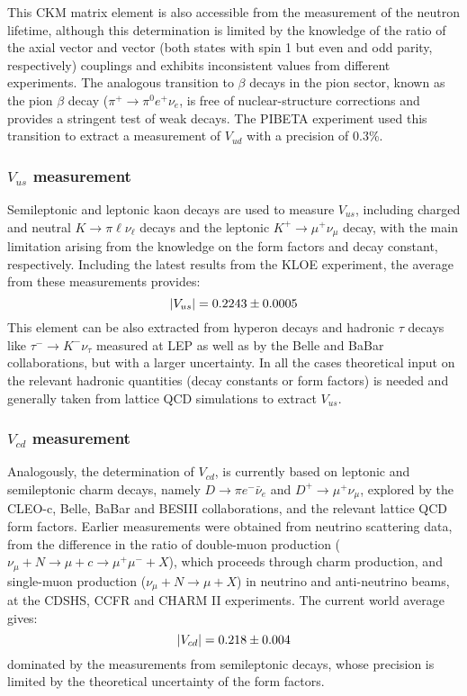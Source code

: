 \documentclass[../../main/main.tex]{subfiles}
\begin{document}
This CKM matrix element is also accessible from the measurement of the neutron lifetime, although this determination is limited by the knowledge of the ratio of the axial vector and vector (both states with spin 1 but even and odd parity, respectively) couplings and exhibits inconsistent values from different experiments.
The analogous transition to \( \beta \) decays in the pion sector, known as the pion \( \beta \) decay (\( \pi^+ \rightarrow \pi^0e^+\nu_e \), is free of nuclear-structure corrections and provides a stringent test of weak decays. The PIBETA experiment used this transition to extract a measurement of \( V_{ud} \) with a precision of 0.3\%.


\subsubsection*{\( V_{us} \) measurement}
Semileptonic and leptonic kaon decays are used to measure \( V_{us} \), including charged and neutral \( K \rightarrow \pi \ell \nu_{\ell} \) decays and the leptonic \( K^+ \rightarrow \mu^+\nu_{\mu} \) decay, with the main limitation arising from the knowledge on the form factors and decay constant, respectively. Including the latest results from the KLOE experiment, the average from these measurements provides:
\begin{equation}
	\abs{V_{us}}
	=
	0.2243 \pm 0.0005
	\label{eq:}
\end{equation}
This element can be also extracted from hyperon decays and hadronic \( \tau \) decays like \( \tau^- \rightarrow K^- \nu_{\tau} \) measured at LEP as well as by the Belle and BaBar collaborations, but with a larger uncertainty. In all the cases theoretical input on the relevant hadronic quantities (decay constants or form factors) is needed and generally taken from lattice QCD simulations to extract \( V_{us} \).


\subsubsection*{\( V_{cd} \) measurement}
Analogously, the determination of \( V_{cd} \), is currently based on leptonic and semileptonic charm decays, namely \( D \rightarrow \pi e^- \bar{\nu}_e \) and \( D^+ \rightarrow \mu^+ \nu_{\mu} \), explored by the CLEO-c, Belle, BaBar and BESIII collaborations, and the relevant lattice QCD form factors. Earlier measurements were obtained from neutrino scattering data, from the difference in the ratio of double-muon production (\( \nu_{\mu} + N \rightarrow \mu + c \rightarrow \mu^+\mu^- + X \)), which proceeds through charm production, and single-muon production (\( \nu_{\mu} + N \rightarrow \mu + X \)) in neutrino and anti-neutrino beams, at the CDSHS, CCFR and CHARM II experiments. The current world average gives:
\begin{equation}
	\abs{V_{cd}}
	=
	0.218 \pm 0.004
	\label{eq:}
\end{equation}
dominated by the measurements from semileptonic decays, whose precision is limited by the theoretical uncertainty of the form factors.
\end{document}

